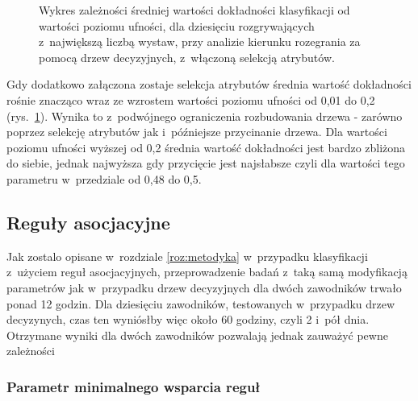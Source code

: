 \documentclass[a4paper,twoside,12pt]{book}
\begin{document}
\begin{figure}
\centering
{}
\caption{Wykres zależności średniej wartości dokładności klasyfikacji od wartości poziomu ufności, dla dziesięciu rozgrywających z~największą liczbą wystaw, przy analizie kierunku rozegrania za pomocą drzew decyzyjnych, z~włączoną selekcją atrybutów.}
\label{fig:confidence-r-kierunek-auto}
\end{figure}

Gdy dodatkowo załączona zostaje selekcja atrybutów średnia wartość dokładności rośnie znacząco wraz ze wzrostem wartości poziomu ufności od 0,01 do 0,2 (rys.~\ref{fig:confidence-r-kierunek-auto}). Wynika to z~podwójnego ograniczenia rozbudowania drzewa - zarówno poprzez selekcję atrybutów jak i~późniejsze przycinanie drzewa. Dla wartości poziomu ufności wyższej od 0,2 średnia wartość dokładności jest bardzo zbliżona do siebie, jednak najwyższa gdy przycięcie jest najsłabsze czyli dla wartości tego parametru w~przedziale od 0,48 do 0,5.

\subsection{Reguły asocjacyjne}

Jak zostalo opisane w~rozdziale \ref{roz:metodyka} w~przypadku klasyfikacji z~użyciem reguł asocjacyjnych, przeprowadzenie badań z~taką samą modyfikacją parametrów jak w~przypadku drzew decyzyjnych dla dwóch zawodników trwało ponad 12 godzin. Dla dziesięciu zawodników, testowanych w~przypadku drzew decyzynych, czas ten wyniósłby więc około 60 godziny, czyli 2 i~pół dnia. Otrzymane wyniki dla dwóch zawodników pozwalają jednak zauważyć pewne zależności

\subsubsection{Parametr minimalnego wsparcia reguł}
\end{document}
